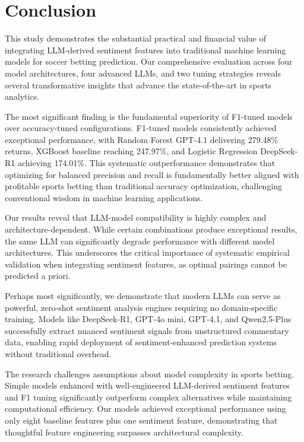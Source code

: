 \documentclass[conference]{IEEEtran}
\begin{document}
\section{Conclusion}
This study demonstrates the substantial practical and financial value of integrating LLM-derived sentiment features into traditional machine learning models for soccer betting prediction. Our comprehensive evaluation across four model architectures, four advanced LLMs, and two tuning strategies reveals several transformative insights that advance the state-of-the-art in sports analytics.

The most significant finding is the fundamental superiority of F1-tuned models over accuracy-tuned configurations. F1-tuned models consistently achieved exceptional performance, with Random Forest GPT-4.1 delivering 279.48\% returns, XGBoost baseline reaching 247.97\%, and Logistic Regression DeepSeek-R1 achieving 174.01\%. This systematic outperformance demonstrates that optimizing for balanced precision and recall is fundamentally better aligned with profitable sports betting than traditional accuracy optimization, challenging conventional wisdom in machine learning applications.

Our results reveal that LLM-model compatibility is highly complex and architecture-dependent. While certain combinations produce exceptional results, the same LLM can significantly degrade performance with different model architectures. This underscores the critical importance of systematic empirical validation when integrating sentiment features, as optimal pairings cannot be predicted a priori.

Perhaps most significantly, we demonstrate that modern LLMs can serve as powerful, zero-shot sentiment analysis engines requiring no domain-specific training. Models like DeepSeek-R1, GPT-4o mini, GPT-4.1, and Qwen2.5-Plus successfully extract nuanced sentiment signals from unstructured commentary data, enabling rapid deployment of sentiment-enhanced prediction systems without traditional overhead.

The research challenges assumptions about model complexity in sports betting. Simple models enhanced with well-engineered LLM-derived sentiment features and F1 tuning significantly outperform complex alternatives while maintaining computational efficiency. Our models achieved exceptional performance using only eight baseline features plus one sentiment feature, demonstrating that thoughtful feature engineering surpasses architectural complexity.
\end{document}
